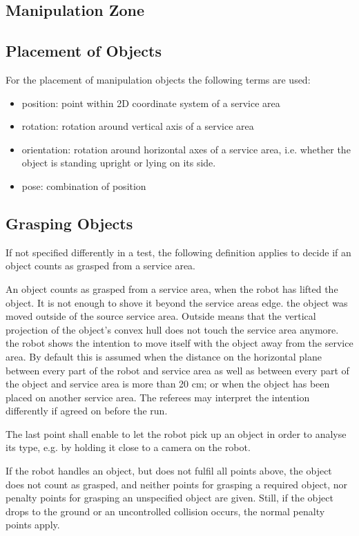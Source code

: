 \subsection{Manipulation Zone}

\subsection{Placement of Objects}
For the placement of manipulation objects the following terms are used:

\begin{itemize}
\item position: point within 2D coordinate system of a service area
\item rotation: rotation around vertical axis of a service area
\item orientation: rotation around horizontal axes of a service area, i.e. whether the object is standing upright or lying on its side.
\item pose: combination of position
\end{itemize}

\subsection{Grasping Objects}
If not specified differently in a test, the following definition applies to decide if an object counts as grasped from a service area.
\par
An object counts as grasped from a service area, when
the robot has lifted the object. It is not enough to shove it beyond the service areas edge.
the object was moved outside of the source service area. Outside means that the vertical projection of the object’s convex hull does not touch the service area anymore.
the robot shows the intention to move itself with the object away from the service area. By default this is assumed when the distance on the horizontal plane between every part of the robot and service area as well as between every part of the object and service area is more than 20 cm; or when the object has been placed on another service area. The referees may interpret the intention differently if agreed on before the run.
\par
The last point shall enable to let the robot pick up an object in order to analyse its type, e.g. by holding it close to a camera on the robot.
\par
If the robot handles an object, but does not fulfil all points above, the object does not count as grasped, and neither points for grasping a required object, nor penalty points for grasping an unspecified object are given. Still, if the object drops to the ground or an uncontrolled collision occurs, the normal penalty points apply.

